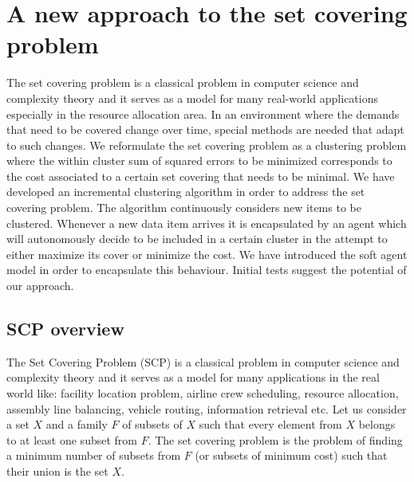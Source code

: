 \section{A new approach to the set covering problem}
\label{sec:scp}

The set covering problem is a classical problem in computer science and complexity theory and it serves as a model for many real-world applications especially in the resource allocation area. In an environment where the demands that need to be covered change over time, special methods are needed that adapt to such changes. We reformulate the set covering problem as a clustering problem where the within cluster sum of squared errors to be minimized corresponds to the cost associated to a certain set covering that needs to be minimal. We have developed an incremental clustering algorithm in order to address the set covering problem. The algorithm continuously considers new items to be clustered. Whenever a new data item arrives it is encapsulated by an agent which will autonomously decide to be included in a certain cluster in the attempt to either maximize its cover or minimize the cost. We have introduced the soft agent model in order to encapsulate this behaviour. Initial tests suggest the potential of our approach.


\subsection{SCP overview}

The Set Covering Problem (SCP) is a classical problem in computer science and complexity theory and it serves as a model for many applications in the real world like: facility location problem, airline crew scheduling, resource allocation, assembly line balancing, vehicle routing, information retrieval etc. Let us consider a set $X$ and a family $F$ of subsets of $X$ such that every element from $X$ belongs to at least one subset from $F$. The set covering problem is the problem of finding a minimum number of subsets from $F$ (or subsets of minimum cost) such that their union is the set $X$.

